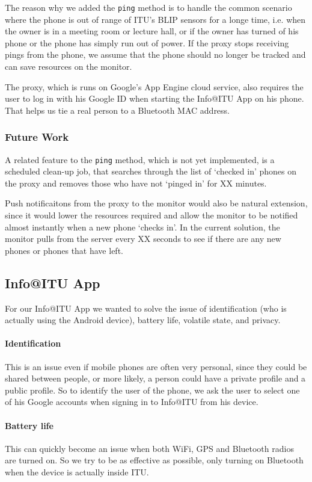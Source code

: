 \documentclass{ubicomp2011}
\begin{document}
The reason why we added the \texttt{ping} method is to handle the common scenario where the phone is out of range of ITU's BLIP sensors for a longe time, i.e. when the owner is in a meeting room or lecture hall, or if the owner has turned of his phone or the phone has simply run out of power. If the proxy stops receiving pings from the phone, we assume that the phone should no longer be tracked and can save resources on the monitor.

The proxy, which is runs on Google's App Engine cloud service, also requires the user to log in with his Google ID when starting the Info@ITU App on his phone. That helps us tie a real person to a Bluetooth MAC address.

\subsubsection{Future Work}
A related feature to the \texttt{ping} method, which is not yet implemented, is a scheduled clean-up job, that searches through the list of `checked in' phones on the proxy and removes those who have not `pinged in' for XX minutes.

Push notificaitons from the proxy to the monitor would also be natural extension, since it would lower the resources required and allow the monitor to be notified almost instantly when a new phone `checks in'. In the current solution, the monitor pulls from the server every XX seconds to see if there are any new phones or phones that have left.

\subsection{Info@ITU App}
    For our Info@ITU App we wanted to solve the issue of identification (who is actually using the Android device), battery life, volatile state, and privacy.
    
    \paragraph{Identification} This is an issue even if mobile phones are often very personal, since they could be shared between people, or more likely, a person could have a private profile and a public profile. So to identify the user of the phone, we ask the user to select one of his Google accounts when signing in to Info@ITU from his device.
    
    \paragraph{Battery life} This can quickly become an issue when both WiFi, GPS and Bluetooth radios are turned on. So we try to be as effective as possible, only turning on Bluetooth when the device is actually inside ITU.
    
\end{document}
